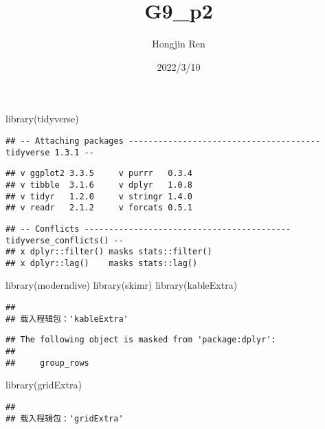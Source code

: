 \documentclass[
]{article}
\title{G9\_p2}
\author{Hongjin Ren}
\date{2022/3/10}
\newenvironment{Shaded}{\begin{snugshade}}{\end{snugshade}}
\newcommand{\FunctionTok}[1]{\textcolor[rgb]{0.00,0.00,0.00}{#1}}
\newcommand{\NormalTok}[1]{#1}
\begin{document}
\maketitle

\begin{Shaded}
\begin{Highlighting}[]
\FunctionTok{library}\NormalTok{(tidyverse)}
\end{Highlighting}
\end{Shaded}

\begin{verbatim}
## -- Attaching packages --------------------------------------- tidyverse 1.3.1 --
\end{verbatim}

\begin{verbatim}
## v ggplot2 3.3.5     v purrr   0.3.4
## v tibble  3.1.6     v dplyr   1.0.8
## v tidyr   1.2.0     v stringr 1.4.0
## v readr   2.1.2     v forcats 0.5.1
\end{verbatim}

\begin{verbatim}
## -- Conflicts ------------------------------------------ tidyverse_conflicts() --
## x dplyr::filter() masks stats::filter()
## x dplyr::lag()    masks stats::lag()
\end{verbatim}

\begin{Shaded}
\begin{Highlighting}[]
\FunctionTok{library}\NormalTok{(moderndive)}
\FunctionTok{library}\NormalTok{(skimr)}
\FunctionTok{library}\NormalTok{(kableExtra)}
\end{Highlighting}
\end{Shaded}

\begin{verbatim}
## 
## 载入程辑包：'kableExtra'
\end{verbatim}

\begin{verbatim}
## The following object is masked from 'package:dplyr':
## 
##     group_rows
\end{verbatim}

\begin{Shaded}
\begin{Highlighting}[]
\FunctionTok{library}\NormalTok{(gridExtra)}
\end{Highlighting}
\end{Shaded}

\begin{verbatim}
## 
## 载入程辑包：'gridExtra'
\end{verbatim}
\end{document}
